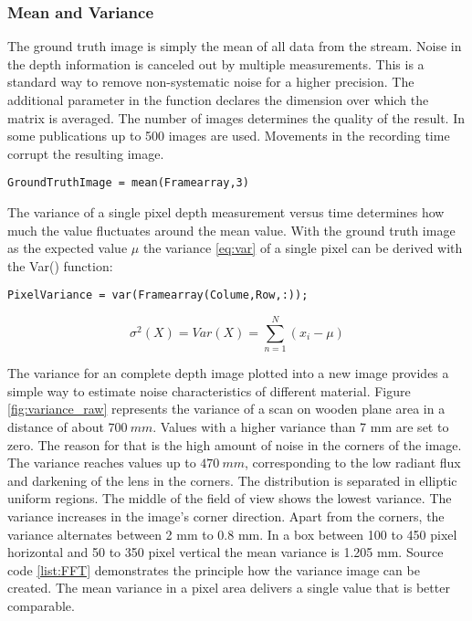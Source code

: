 \subsubsection{Mean and Variance}
The ground truth image is simply the mean of all data from the stream. Noise in the depth information is canceled out by multiple measurements. This is a standard way to remove non-systematic noise for a higher precision. The additional parameter in the function declares the dimension over which the matrix is averaged. The number of images determines the quality of the result. In some publications up to 500 images are used. Movements in the recording time corrupt the resulting image.
\medskip
\begin{lstlisting}
GroundTruthImage = mean(Framearray,3) 
\end{lstlisting} 
\medskip
The variance of a single pixel depth measurement versus time determines how much the value fluctuates around the mean value. With the ground truth image as the expected value $\mu$ the variance \ref{eq:var} of a single pixel can be derived with the Var() function:
\medskip
\begin{lstlisting}
PixelVariance = var(Framearray(Colume,Row,:));
\end{lstlisting}

\begin{equation}\label{eq:var}
\sigma^2(X)=Var(X)=\sum_{n=1}^N (x_i -\mu)
\end{equation}

The variance for an complete depth image plotted into a new image provides a simple way to estimate noise characteristics of different material. Figure \ref{fig:variance_raw} represents the variance of a scan on wooden plane area in a distance of about $700~mm$. Values with a higher variance than 7 mm are set to zero. The reason for that is the high amount of noise in the corners of the image. The variance reaches values up to $470~mm$, corresponding to the low radiant flux and darkening of the lens in the corners. The distribution is separated in elliptic uniform regions. The middle of the field of view shows the lowest variance. The variance increases in the image's corner direction. Apart from the corners, the variance alternates between 2 mm to 0.8 mm. In a box between 100 to 450 pixel horizontal and 50 to 350 pixel vertical the mean variance is 1.205 mm. Source code \ref{list:FFT} demonstrates the principle how the variance image can be created. The mean variance in a pixel area delivers a single value that is better comparable.


